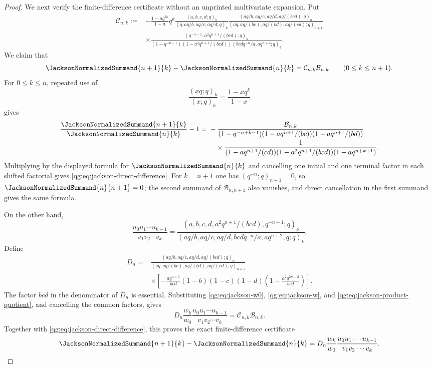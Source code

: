\begin{proof}
We next verify the finite-difference certificate without an unprinted
multivariate expansion.  Put
\begin{align*}
\mathcal C_{n,k}:={}&-
 \frac{1-aq^{2k}}{1-a}q^k
 \frac{(a,b,c,d;q)_k}{(q,aq/b,aq/c,aq/d;q)_k}
 \frac{(aq/b,aq/c,aq/d,aq/(bcd);q)_n}
 {(aq,aq/(bc),aq/(bd),aq/(cd);q)_{n+1}}\\
&\times
 \frac{(q^{-n-1},a^2q^{n+1}/(bcd);q)_k}
 {(1-q^{-n-1})(1-a^2q^{n+1}/(bcd))
  (bcdq^{-n}/a,aq^{n+2};q)_k}.
\end{align*}
We claim that
\begin{equation}
\label{qg:eq:jackson-direct-difference}
 \JacksonNormalizedSummand{n+1}{k}-\JacksonNormalizedSummand{n}{k}
 =\mathcal C_{n,k}\mathcal B_{n,k}
 \qquad(0\le k\le n+1).
\end{equation}
For $0\le k\le n$, repeated use of
\[
 \frac{(xq;q)_k}{(x;q)_k}=\frac{1-xq^k}{1-x}
\]
gives
\begin{align*}
\frac{\JacksonNormalizedSummand{n+1}{k}}
     {\JacksonNormalizedSummand{n}{k}}-1
={}&-\frac{\mathcal B_{n,k}}
{(1-q^{-n+k-1})(1-aq^{n+1}/(bc))(1-aq^{n+1}/(bd))}\\
&\quad\times
\frac1{(1-aq^{n+1}/(cd))(1-a^2q^{n+1}/(bcd))
(1-aq^{n+k+1})}.
\end{align*}
Multiplying by the displayed formula for $\JacksonNormalizedSummand{n}{k}$
and cancelling one initial
and one terminal factor in each shifted factorial gives
\eqref{qg:eq:jackson-direct-difference}.  For $k=n+1$ one has
$(q^{-n};q)_{n+1}=0$, so $\JacksonNormalizedSummand{n}{n+1}=0$; the second summand of
\(\mathcal B_{n,n+1}\) also vanishes, and direct cancellation in the first
summand gives the same formula.

On the other hand,
\begin{equation}
\label{qg:eq:jackson-product-quotient}
 \frac{u_0u_1\cdots u_{k-1}}{v_1v_2\cdots v_k}
 =\frac{(a,b,c,d,a^2q^{n+1}/(bcd),q^{-n-1};q)_k}
 {(aq/b,aq/c,aq/d,bcdq^{-n}/a,aq^{n+2},q;q)_k}.
\end{equation}
Define
\begin{align*}
D_n={}&
 \frac{(aq/b,aq/c,aq/d,aq/(bcd);q)_n}
 {(aq,aq/(bc),aq/(bd),aq/(cd);q)_{n+1}}\\
&\times\left[-\frac{aq^{n+1}}{bcd}(1-b)(1-c)(1-d)
 \left(1-\frac{a^2q^{2n+2}}{bcd}\right)\right].
\end{align*}
The factor $bcd$ in the denominator of $D_n$ is essential.  Substituting
\eqref{qg:eq:jackson-w0}, \eqref{qg:eq:jackson-w}, and
\eqref{qg:eq:jackson-product-quotient}, and cancelling the common factors,
gives
\[
 D_n\frac{w_k}{w_0}
 \frac{u_0u_1\cdots u_{k-1}}{v_1v_2\cdots v_k}
 =\mathcal C_{n,k}\mathcal B_{n,k}.
\]
Together with \eqref{qg:eq:jackson-direct-difference}, this proves the exact
finite-difference certificate
\begin{equation}
\label{qg:eq:jackson-finite-difference}
 \JacksonNormalizedSummand{n+1}{k}-\JacksonNormalizedSummand{n}{k}
 =D_n\frac{w_k}{w_0}
 \frac{u_0u_1\cdots u_{k-1}}{v_1v_2\cdots v_k}.
\end{equation}


\end{proof}
